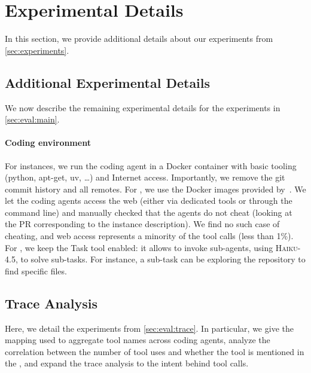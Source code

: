 \section{Experimental Details}
\label{app:experiments}

In this section, we provide additional details about our experiments from \cref{sec:experiments}.

\subsection{Additional Experimental Details}
\label{app:experiments:setup}

We now describe the remaining experimental details for the experiments in \cref{sec:eval:main}.

\paragraph{Coding environment}
For \planbench{} instances, we run the coding agent in a Docker container with basic tooling (python, apt-get, uv, \ldots) and Internet access.
Importantly, we remove the git commit history and all remotes.
For \swebench{}, we use the Docker images provided by~\citet{swebench}.
We let the coding agents access the web (either via dedicated tools or through the command line) and manually checked that the agents do not cheat (\eg looking at the PR corresponding to the instance description).
We find no such case of cheating, and web access represents a minority of the tool calls (less than 1\%).
For \claudecode{}, we keep the Task tool enabled: it allows \sonnet{} to invoke sub-agents, using \textsc{Haiku-4.5}, to solve sub-tasks.
For instance, a sub-task can be exploring the repository to find specific files.

\subsection{Trace Analysis}

Here, we detail the experiments from \cref{sec:eval:trace}.
In particular, we give the mapping used to aggregate tool names across coding agents, analyze the correlation between the number of tool uses and whether the tool is mentioned in the \agentsmds{}, and expand the trace analysis to the intent behind tool calls.

